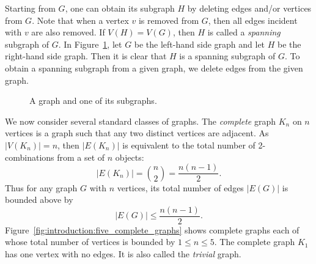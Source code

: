 Starting from $G$, one can obtain its subgraph $H$ by deleting edges
and/or vertices from $G$. Note that when a vertex $v$ is removed from
$G$, then all edges incident with $v$ are also removed. If $V(H) =
V(G)$, then $H$ is called a \emph{spanning} subgraph of $G$. In
Figure~\ref{fig:introduction:star_subgraph}, let $G$ be the left-hand
side graph and let $H$ be the right-hand side graph. Then it is clear
that $H$ is a spanning subgraph of $G$. To obtain a spanning subgraph
from a given graph, we delete edges from the given graph.

\begin{figure}[!htbp]
\centering
\qquad
\caption{A graph and one of its subgraphs.}
\label{fig:introduction:star_subgraph}
\end{figure}

We now consider several standard classes of graphs. The \emph{complete}
graph $K_n$ on $n$ vertices is a graph such that any two distinct
vertices are adjacent. As $|V(K_n)| = n$, then $|E(K_n)|$ is
equivalent to the total number of 2-combinations from a set of $n$
objects:
%
\begin{equation}
\label{eq:introduction:size_of_K_n}
|E(K_n)|
=
\binom{n}{2}
=
\frac{n(n-1)}{2}.
\end{equation}
%
Thus for any graph $G$ with $n$ vertices, its total number of edges
$|E(G)|$ is bounded above by
\[
|E(G)|
\leq
\frac{n(n - 1)}{2}.
\]
Figure~\ref{fig:introduction:five_complete_graphs} shows complete
graphs each of whose total number of vertices is bounded by
$1 \leq n \leq 5$. The complete graph $K_1$ has one vertex with
no edges. It is also called the \emph{trivial} graph.

